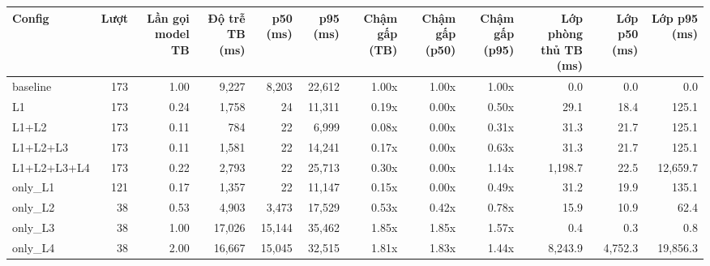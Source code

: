 \begin{tabular}{lrrrrrrrrrrr}
\toprule
Config & Lượt & Lần gọi model TB & Độ trễ TB (ms) & p50 (ms) & p95 (ms) & Chậm gấp (TB) & Chậm gấp (p50) & Chậm gấp (p95) & Lớp phòng thủ TB (ms) & Lớp p50 (ms) & Lớp p95 (ms) \\
\midrule
baseline & 173 & 1.00 & 9,227 & 8,203 & 22,612 & 1.00x & 1.00x & 1.00x & 0.0 & 0.0 & 0.0 \\
L1 & 173 & 0.24 & 1,758 & 24 & 11,311 & 0.19x & 0.00x & 0.50x & 29.1 & 18.4 & 125.1 \\
L1+L2 & 173 & 0.11 & 784 & 22 & 6,999 & 0.08x & 0.00x & 0.31x & 31.3 & 21.7 & 125.1 \\
L1+L2+L3 & 173 & 0.11 & 1,581 & 22 & 14,241 & 0.17x & 0.00x & 0.63x & 31.3 & 21.7 & 125.1 \\
L1+L2+L3+L4 & 173 & 0.22 & 2,793 & 22 & 25,713 & 0.30x & 0.00x & 1.14x & 1,198.7 & 22.5 & 12,659.7 \\
only\_L1 & 121 & 0.17 & 1,357 & 22 & 11,147 & 0.15x & 0.00x & 0.49x & 31.2 & 19.9 & 135.1 \\
only\_L2 & 38 & 0.53 & 4,903 & 3,473 & 17,529 & 0.53x & 0.42x & 0.78x & 15.9 & 10.9 & 62.4 \\
only\_L3 & 38 & 1.00 & 17,026 & 15,144 & 35,462 & 1.85x & 1.85x & 1.57x & 0.4 & 0.3 & 0.8 \\
only\_L4 & 38 & 2.00 & 16,667 & 15,045 & 32,515 & 1.81x & 1.83x & 1.44x & 8,243.9 & 4,752.3 & 19,856.3 \\
\bottomrule
\end{tabular}
